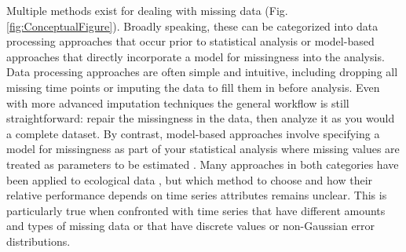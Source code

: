 \documentclass[12pt,english]{article} %
\begin{document}
\begin{linenumbers}
\begin{spacing}{1.9}
\begin{flushleft}
\hspace{1em} Multiple methods exist for dealing with missing data (Fig. \ref{fig:ConceptualFigure}). Broadly speaking, these can be categorized into data processing approaches that occur prior to statistical analysis or model-based approaches that directly incorporate a model for missingness into the analysis. Data processing approaches are often simple and intuitive, including dropping all missing time points or imputing the data to fill them in before analysis. Even with more advanced imputation techniques \citep{nakagawa_model_2011, nakagawa_missing_2015, kang2013prevention, onkelinx_working_2017, rubin1996multiple, rubin1988overview} the general workflow is still straightforward: repair the missingness in the data, then analyze it as you would a complete dataset. By contrast, model-based approaches involve specifying a model for missingness as part of your statistical analysis where missing values are treated as parameters to be estimated \citep{nadjafi2022expectation, li2019expectation, kang2013prevention, kalman_filter_1960, kong_sequential_1994}. Many approaches in both categories have been applied to ecological data \citep{Newman2023, Soldaat2007}, but which method to choose and how their relative performance depends on time series attributes remains unclear. This is particularly true when confronted with time series that have different amounts and types of missing data or that have discrete values or non-Gaussian error distributions.


\end{flushleft}
\end{spacing}
\end{linenumbers}
\end{document}
